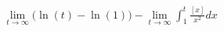 \documentclass[preview]{standalone}
\begin{document}
\begin{align*}
\lim_{t\to\infty} \bigg(\ln(t)-\ln(1)\bigg)- \lim_{t\to\infty}\int_{1}^{t}\frac{[x]}{x^2}dx
\end{align*}
\end{document}
